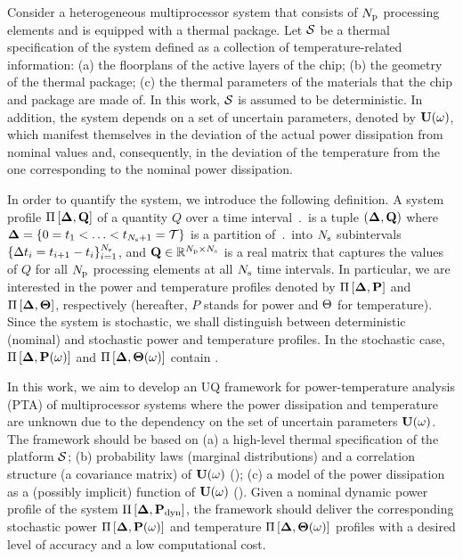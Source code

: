 Consider a heterogeneous multiprocessor system that consists of ${N_\text{p}}$ processing elements and is equipped with a thermal package. Let $\mathcal{S}$ be a thermal specification of the system defined as a collection of temperature-related information: (a) the floorplans of the active layers of the chip; (b) the geometry of the thermal package; (c) the thermal parameters of the materials that the chip and package are made of. In this work, $\mathcal{S}$ is assumed to be deterministic. In addition, the system depends on a set of uncertain parameters, denoted by $\mathbf{U}(\omega)$, which manifest themselves in the deviation of the actual power dissipation from nominal values and, consequently, in the deviation of the temperature from the one corresponding to the nominal power dissipation.

In order to quantify the system, we introduce the following definition. A system profile $\prof{\m{Q}}$ of a quantity $Q$ over a time interval $\period$ is a tuple $(\part, \m{Q})$ where $\boldsymbol{\Delta} = \{ 0 = t_1 < \dotsc < t_{N_\text{s} + 1} = \mathcal{T} \}$ is a partition of $\period$ into $N_\text{s}$ subintervals $\{ \Delta t_i = t_{i+1} - t_i \}_{i = 1}^{N_\text{s}}$, and $\m{Q} \in \real^{\cores \times \steps}$ is a real matrix that captures the values of $Q$ for all ${N_\text{p}}$ processing elements at all $N_\text{s}$ time intervals. In particular, we are interested in the power and temperature profiles denoted by $\prof{\mP}$ and $\Pi\left[\boldsymbol{\Delta}, {\boldsymbol\Theta}\right]$, respectively (hereafter, $P$ stands for power and $\Theta$ for temperature). Since the system is stochastic, we shall distinguish between deterministic (nominal) and stochastic power and temperature profiles. In the stochastic case, $\prof{\mP(\o)}$ and $\Pi\left[\boldsymbol{\Delta}, {\boldsymbol\Theta}(\omega)\right]$ contain \rvs.

In this work, we aim to develop an UQ framework for power-temperature analysis (PTA) of multiprocessor systems where the power dissipation and temperature are unknown due to the dependency on the set of uncertain parameters $\mathbf{U}(\omega)$. The framework should be based on (a) a high-level thermal specification of the platform $\mathcal{S}$; (b) probability laws (marginal distributions) and a correlation structure (a covariance matrix) of $\mathbf{U}(\omega)$ (); (c) a model of the power dissipation as a (possibly implicit) function of $\mathbf{U}(\omega)$ (). Given a nominal dynamic power profile of the system $\prof{\mP_\dyn}$, the framework should deliver the corresponding stochastic power $\Pi\left[\boldsymbol{\Delta}, \mathbf{P}(\omega)\right]$ and temperature $\Pi\left[\boldsymbol{\Delta}, {\boldsymbol\Theta}(\omega)\right]$ profiles with a desired level of accuracy and a low computational cost.
